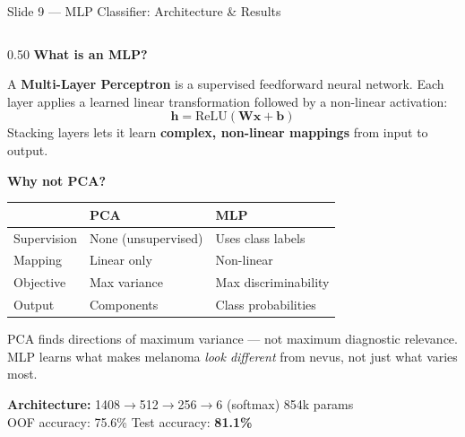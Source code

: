 \documentclass[aspectratio=169, 9pt]{beamer}
\begin{document}
\begin{frame}{Slide 9 --- MLP Classifier: Architecture \& Results}

  \begin{columns}[T]

    \begin{column}{0.50\textwidth}
      \textbf{\color{navyblue}What is an MLP?}

      \vspace{0.2em}
      {\small
      A \textbf{Multi-Layer Perceptron} is a supervised feedforward neural
      network. Each layer applies a learned linear transformation followed
      by a non-linear activation:
      \[
        \mathbf{h} = \text{ReLU}(\mathbf{W}\mathbf{x} + \mathbf{b})
      \]
      Stacking layers lets it learn \textbf{complex, non-linear mappings}
      from input to output.}

      \vspace{0.3em}
      \textbf{\color{navyblue}Why not PCA?}

      \vspace{0.2em}
      {\small
      \begin{tabular}{@{} p{1.5cm} p{2.0cm} p{2.0cm} @{}}
        \toprule
        & PCA & MLP \\
        \midrule
        Supervision  & None (unsupervised) & Uses class labels \\
        Mapping      & Linear only         & Non-linear \\
        Objective    & Max variance        & Max discriminability \\
        Output       & Components          & Class probabilities \\
        \bottomrule
      \end{tabular}
      }

      \vspace{0.2em}
      {\scriptsize\color{gray}
      PCA finds directions of maximum variance --- not maximum diagnostic
      relevance. MLP learns what makes melanoma \textit{look different}
      from nevus, not just what varies most.}

      \vspace{0.3em}
      {\small\textbf{Architecture:} 1408$\to$512$\to$256$\to$6 (softmax)
      \quad 854k params\\
      OOF accuracy: 75.6\% \quad Test accuracy: \textbf{81.1\%}}
    \end{column}


\end{columns}
\end{frame}
\end{document}

